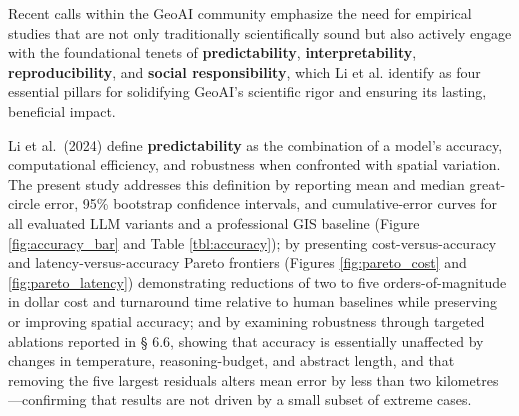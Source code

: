 Recent calls within the GeoAI community emphasize the need for empirical
studies that are not only traditionally scientifically sound but also
actively engage with the foundational tenets of \textbf{predictability},
\textbf{interpretability}, \textbf{reproducibility}, and \textbf{social
responsibility}, which Li et al. \citep{Li2024_geoai} identify as four
essential pillars for solidifying GeoAI's scientific rigor and ensuring
its lasting, beneficial impact.

Li et al.~(2024) define \textbf{predictability} as the combination of a
model's accuracy, computational efficiency, and robustness when
confronted with spatial variation. The present study addresses this
definition by reporting mean and median great-circle error, 95\%
bootstrap confidence intervals, and cumulative-error curves for all
evaluated LLM variants and a professional GIS baseline (Figure
\ref{fig:accuracy_bar} and Table \ref{tbl:accuracy}); by presenting
cost-versus-accuracy and latency-versus-accuracy Pareto frontiers
(Figures \ref{fig:pareto_cost} and \ref{fig:pareto_latency})
demonstrating reductions of two to five orders-of-magnitude in dollar
cost and turnaround time relative to human baselines while preserving or
improving spatial accuracy; and by examining robustness through targeted
ablations reported in § 6.6, showing that accuracy is essentially
unaffected by changes in temperature, reasoning-budget, and abstract
length, and that removing the five largest residuals alters mean error
by less than two kilometres---confirming that results are not driven by
a small subset of extreme cases.

